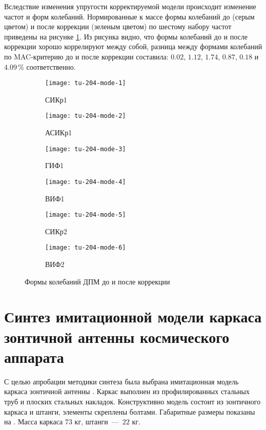 Вследствие изменения упругости корректируемой модели происходит изменение частот и форм колебаний. Нормированные к массе формы колебаний до (серым цветом) и после коррекции (зеленым цветом) по шестому набору частот приведены на рисунке \ref{fig:tu-204-modes}. Из рисунка видно, что формы колебаний до и после коррекции хорошо коррелируют между собой, разница между формами колебаний по MAC-критерию до и после коррекции составила: $ 0.02 $, $ 1.12 $, $ 1.74 $, $ 0.87 $, $ 0.18 $ и $ 4.09 $\,\% соответственно.

\def\sfTu204Mode{0.32\textwidth}

\begin{figure}[H]
	\centering
	\begin{subfigure}[b]{\sfTu204Mode}
		\centering
		\texttt{[image: tu-204-mode-1]}
		\caption{СИКр1} 
	\end{subfigure}
	\begin{subfigure}[b]{\sfTu204Mode}
		\centering
		\texttt{[image: tu-204-mode-2]}
		\caption{АСИКр1}
	\end{subfigure}
	\begin{subfigure}[b]{\sfTu204Mode}
		\centering
		\texttt{[image: tu-204-mode-3]}
		\caption{ГИФ1}
	\end{subfigure}	
	\begin{subfigure}[b]{\sfTu204Mode}
		\centering
		\texttt{[image: tu-204-mode-4]}
		\caption{ВИФ1}
	\end{subfigure}	
	\begin{subfigure}[b]{\sfTu204Mode}
		\centering
		\texttt{[image: tu-204-mode-5]}
		\caption{СИКр2}
	\end{subfigure}
	\begin{subfigure}[b]{\sfTu204Mode}
		\centering
		\texttt{[image: tu-204-mode-6]}
		\caption{ВИФ2} 
	\end{subfigure}
	\caption{Формы колебаний ДПМ до и после коррекции} \label{fig:tu-204-modes}
\end{figure}

\section{Синтез имитационной модели каркаса зонтичной антенны космического аппарата}

С целью апробации методики синтеза была выбрана имитационная модель каркаса зонтичной антенны . Каркас выполнен из профилированных стальных труб и плоских стальных накладок. Конструктивно модель состоит из зонтичного каркаса и штанги, элементы скреплены болтами. Габаритные размеры показаны на . Масса каркаса $ 73 $ кг, штанги~---~$ 22 $ кг.


